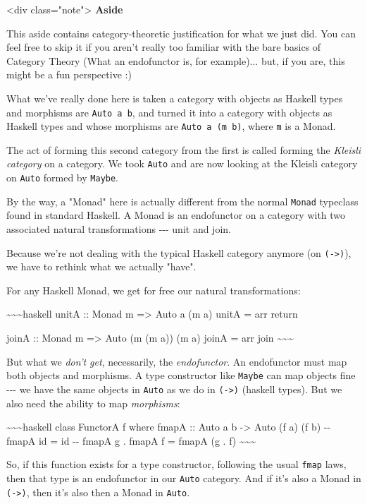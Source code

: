 \documentclass[]{article}
\begin{document}
\textless{}div class="note"\textgreater{} \textbf{Aside}

This aside contains category-theoretic justification for what we just did. You
can feel free to skip it if you aren't really too familiar with the bare basics
of Category Theory (What an endofunctor is, for example)... but, if you are,
this might be a fun perspective :)

What we've really done here is taken a category with objects as Haskell types
and morphisms are \texttt{Auto\ a\ b}, and turned it into a category with
objects as Haskell types and whose morphisms are \texttt{Auto\ a\ (m\ b)}, where
\texttt{m} is a Monad.

The act of forming this second category from the first is called forming the
\emph{Kleisli category} on a category. We took \texttt{Auto} and are now looking
at the Kleisli category on \texttt{Auto} formed by \texttt{Maybe}.

By the way, a "Monad" here is actually different from the normal \texttt{Monad}
typeclass found in standard Haskell. A Monad is an endofunctor on a category
with two associated natural transformations -\/-\/- unit and join.

Because we're not dealing with the typical Haskell category anymore (on
\texttt{(-\textgreater{})}), we have to rethink what we actually "have".

For any Haskell Monad, we get for free our natural transformations:

\textasciitilde{}\textasciitilde{}\textasciitilde{}haskell unitA :: Monad m
=\textgreater{} Auto a (m a) unitA = arr return

joinA :: Monad m =\textgreater{} Auto (m (m a)) (m a) joinA = arr join
\textasciitilde{}\textasciitilde{}\textasciitilde{}

But what we \emph{don't get}, necessarily, the \emph{endofunctor}. An
endofunctor must map both objects and morphisms. A type constructor like
\texttt{Maybe} can map objects fine -\/-\/- we have the same objects in
\texttt{Auto} as we do in \texttt{(-\textgreater{})} (haskell types). But we
also need the ability to map \emph{morphisms}:

\textasciitilde{}\textasciitilde{}\textasciitilde{}haskell class FunctorA f
where fmapA :: Auto a b -\textgreater{} Auto (f a) (f b) -\/- fmapA id = id -\/-
fmapA g . fmapA f = fmapA (g . f)
\textasciitilde{}\textasciitilde{}\textasciitilde{}

So, if this function exists for a type constructor, following the usual
\texttt{fmap} laws, then that type is an endofunctor in our \texttt{Auto}
category. And if it's also a Monad in \texttt{(-\textgreater{})}, then it's also
then a Monad in \texttt{Auto}.
\end{document}
